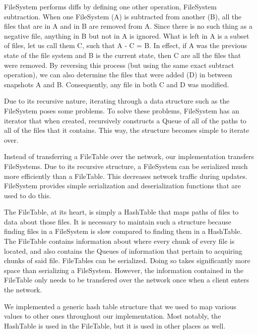 		
			FileSystem performs diffs by defining one other operation, FileSystem subtraction. When one FileSystem (A) is subtracted from another (B), all the files that are in A and in B are removed from A. Since there is no such thing as a negative file, anything in B but not in A is ignored. What is left in A is a subset of files, let us call them C, such that A - C = B. In effect, if A was the previous state of the file system and B is the current state, then C are all the files that were removed. By reversing this process (but using the same exact subtract operation), we can also determine the files that were added (D) in between snapshots A and B. Consequently, any file in both C and D was modified. 
			
		
			Due to its recursive nature, iterating through a data structure such as the FileSystem poses some problems. To solve these problems, FileSystem has an iterator that when created, recursively constructs a Queue of all of the paths to all of the files that it contains. This way, the structure becomes simple to iterate over.
		
		
			Instead of transferring a FileTable over the network, our implementation transfers FileSystems. Due to its recursive structure, a FileSystem can be serialized much more efficiently than a FileTable. This decreases network traffic during updates. FileSystem provides simple serialization and deserialization functions that are used to do this.
		
	
		The FileTable, at its heart, is simply a HashTable that maps paths of files to data about those files. It is necessary to maintain such a structure because finding files in a FileSystem is slow compared to finding them in a HashTable. The FileTable contains information about where every chunk of every file is located, and also contains the Queues of information that pertain to acquiring chunks of said file. FileTables can be serialized. Doing so takes significantly more space than serializing a FileSystem. However, the information contained in the FileTable only needs to be transfered over the network once when a client enters the network. 
	
	
		We implemented a generic hash table structure that we used to map various values to other ones throughout our implementation. Most notably, the HashTable is used in the FileTable, but it is used in other places as well.
	
